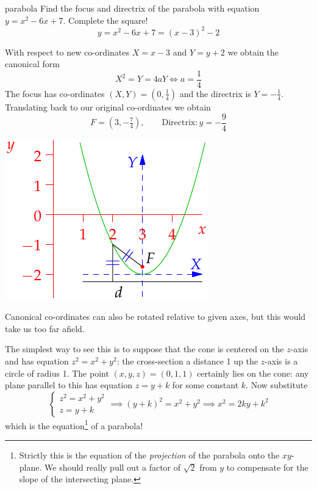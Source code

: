 \begin{example}{}{parabola}
Find the focus and directrix of the parabola with equation $y=x^2-6x+7$.\smallbreak
Complete the square!
\[y=x^2-6x+7=(x-3)^2-2\]
\begin{minipage}[t]{0.65\linewidth}\vspace{-5pt}
With respect to new co-ordinates $X=x-3$ and $Y=y+2$ we obtain the canonical form
\[X^2=Y=4aY\iff a=\frac 14\]
The focus has co-ordinates $(X,Y)=(0,\frac 14)$ and the directrix is $Y=-\frac 14$. Translating back to our original co-ordinates we obtain
\[F=(3,-\tfrac 74),\qquad \text{Directrix}: y=-\frac 94\]
\end{minipage}
\begin{minipage}[t]{0.35\linewidth}\vspace{-10pt}
\flushright\includegraphics{parabola3}
\end{minipage}
\end{example}

Canonical co-ordinates can also be rotated relative to given axes, but this would take us too far afield.


The simplest way to see this is to suppose that the cone is centered on the $z$-axis and has equation $z^2=x^2+y^2$: the cross-section a distance 1 up the $z$-axis is a circle of radius 1. The point $(x,y,z)=(0,1,1)$ certainly lies on the cone: any plane parallel to this has equation $z=y+k$ for some constant $k$. Now substitute
\[\begin{cases}
z^2=x^2+y^2\\
z=y+k
\end{cases} \implies (y+k)^2=x^2+y^2\implies x^2=2ky+k^2\]
which is the equation\footnote{Strictly this is the equation of the \emph{projection} of the parabola onto the $xy$-plane. We should really pull out a factor of $\sqrt{2}$ from $y$ to compensate for the slope of the intersecting plane.} of a parabola!

